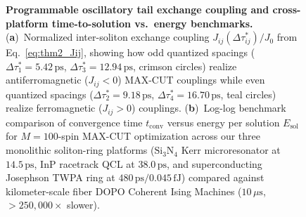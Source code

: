\documentclass[11pt,letterpaper]{article}
\begin{document}
\begin{figure}[t!]
\centering
\resizebox{0.98\textwidth}{!}{}
\caption{\textbf{Programmable oscillatory tail exchange coupling and cross-platform time-to-solution vs.\ energy benchmarks.} (\textbf{a})~Normalized inter-soliton exchange coupling $J_{ij}(\Delta\tau_{ij}^*)/J_0$ from Eq.~\eqref{eq:thm2_Jij}, showing how odd quantized spacings ($\Delta\tau_1^* = 5.42\,\mathrm{ps}$, $\Delta\tau_3^* = 12.94\,\mathrm{ps}$, crimson circles) realize antiferromagnetic ($J_{ij} < 0$) MAX-CUT couplings while even quantized spacings ($\Delta\tau_2^* = 9.18\,\mathrm{ps}$, $\Delta\tau_4^* = 16.70\,\mathrm{ps}$, teal circles) realize ferromagnetic ($J_{ij} > 0$) couplings. (\textbf{b})~Log-log benchmark comparison of convergence time $t_{\mathrm{conv}}$ versus energy per solution $E_{\mathrm{sol}}$ for $M = 100$-spin MAX-CUT optimization across our three monolithic soliton-ring platforms ($\mathrm{Si_3N_4}$ Kerr microresonator at $14.5\,\mathrm{ps}$, InP racetrack QCL at $38.0\,\mathrm{ps}$, and superconducting Josephson TWPA ring at $480\,\mathrm{ps} / 0.045\,\mathrm{fJ}$) compared against kilometer-scale fiber DOPO Coherent Ising Machines ($10\,\mu\mathrm{s}$, $>250{,}000\times$ slower).}
\label{fig:cross_platform}
\end{figure}
\end{document}
